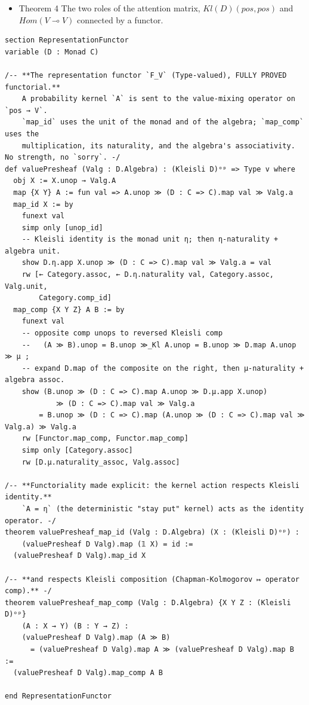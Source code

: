 \documentclass[a4paper,11pt]{article}
\begin{document}
\begin{itemize}
\item
  Theorem 4 The two roles of the attention matrix, \(Kl(D)(pos,pos)\)
  and \(Hom(V\multimap V)\) connected by a functor.
\end{itemize}

\begin{lstlisting}
section RepresentationFunctor
variable (D : Monad C)

/-- **The representation functor `F_V` (Type-valued), FULLY PROVED functorial.**
    A probability kernel `A` is sent to the value-mixing operator on `pos → V`.
    `map_id` uses the unit of the monad and of the algebra; `map_comp` uses the
    multiplication, its naturality, and the algebra's associativity. No strength, no `sorry`. -/
def valuePresheaf (Valg : D.Algebra) : (Kleisli D)ᵒᵖ => Type v where
  obj X := X.unop → Valg.A
  map {X Y} A := fun val => A.unop ≫ (D : C => C).map val ≫ Valg.a
  map_id X := by
    funext val
    simp only [unop_id]
    -- Kleisli identity is the monad unit η; then η-naturality + algebra unit.
    show D.η.app X.unop ≫ (D : C => C).map val ≫ Valg.a = val
    rw [← Category.assoc, ← D.η.naturality val, Category.assoc, Valg.unit,
        Category.comp_id]
  map_comp {X Y Z} A B := by
    funext val
    -- opposite comp unops to reversed Kleisli comp
    --   (A ≫ B).unop = B.unop ≫_Kl A.unop = B.unop ≫ D.map A.unop ≫ μ ;
    -- expand D.map of the composite on the right, then μ-naturality + algebra assoc.
    show (B.unop ≫ (D : C => C).map A.unop ≫ D.μ.app X.unop)
            ≫ (D : C => C).map val ≫ Valg.a
        = B.unop ≫ (D : C => C).map (A.unop ≫ (D : C => C).map val ≫ Valg.a) ≫ Valg.a
    rw [Functor.map_comp, Functor.map_comp]
    simp only [Category.assoc]
    rw [D.μ.naturality_assoc, Valg.assoc]

/-- **Functoriality made explicit: the kernel action respects Kleisli identity.**
    `A = η` (the deterministic "stay put" kernel) acts as the identity operator. -/
theorem valuePresheaf_map_id (Valg : D.Algebra) (X : (Kleisli D)ᵒᵖ) :
    (valuePresheaf D Valg).map (𝟙 X) = id :=
  (valuePresheaf D Valg).map_id X

/-- **and respects Kleisli composition (Chapman-Kolmogorov ↦ operator comp).** -/
theorem valuePresheaf_map_comp (Valg : D.Algebra) {X Y Z : (Kleisli D)ᵒᵖ}
    (A : X → Y) (B : Y → Z) :
    (valuePresheaf D Valg).map (A ≫ B)
      = (valuePresheaf D Valg).map A ≫ (valuePresheaf D Valg).map B :=
  (valuePresheaf D Valg).map_comp A B

end RepresentationFunctor
\end{lstlisting}
\end{document}
